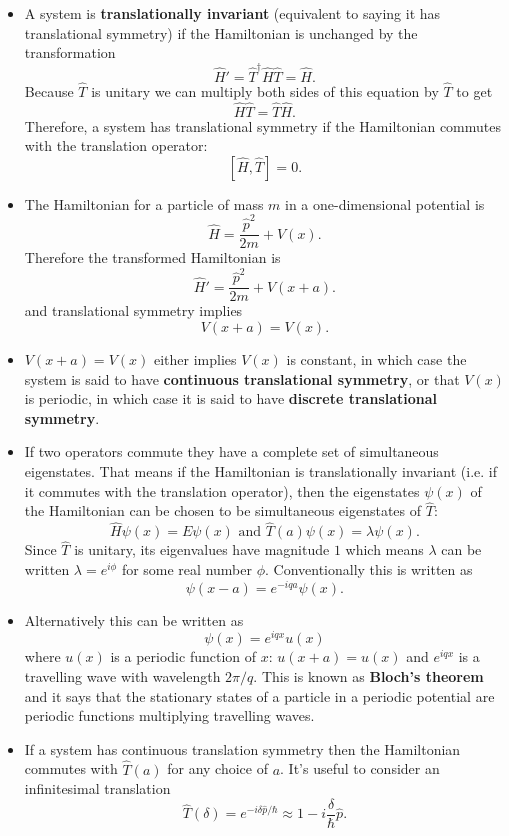 \documentclass{article}
\begin{document}
\begin{itemize}
  \item A system is \textbf{translationally invariant} (equivalent to saying it has translational symmetry) if the Hamiltonian is unchanged by the transformation \[\hat{H}' = \hat{T}^\dagger \hat{H} \hat{T} = \hat{H}.\] Because $\hat{T}$ is unitary we can multiply both sides of this equation by $\hat{T}$ to get \[\hat{H} \hat{T} = \hat{T} \hat{H}.\] Therefore, a system has translational symmetry if the Hamiltonian commutes with the translation operator: \[[\hat{H}, \hat{T}] = 0.\]

  \item The Hamiltonian for a particle of mass $m$ in a one-dimensional potential is \[\hat{H} = \frac{\hat{p}^2}{2 m} + V(x).\] Therefore the transformed Hamiltonian is \[\hat{H}' = \frac{\hat{p}^2}{2 m} + V(x + a).\] and translational symmetry implies \[V(x + a) = V(x).\]

  \item $V(x + a) = V(x)$ either implies $V(x)$ is constant, in which case the system is said to have \textbf{continuous translational symmetry}, or that $V(x)$ is periodic, in which case it is said to have \textbf{discrete translational symmetry}.

  \item If two operators commute they have a complete set of simultaneous eigenstates. That means if the Hamiltonian is translationally invariant (i.e. if it commutes with the translation operator), then the eigenstates $\psi(x)$ of the Hamiltonian can be chosen to be simultaneous eigenstates of $\hat{T}$: \[\hat{H} \psi(x) = E \psi(x) \text{ and } \hat{T}(a) \psi(x) = \lambda \psi(x).\] Since $\hat{T}$ is unitary, its eigenvalues have magnitude $1$ which means $\lambda$ can be written $\lambda = e^{i \phi}$ for some real number $\phi$. Conventionally this is written as \[\psi(x - a) = e^{-i q a} \psi(x).\]

  \item Alternatively this can be written as \[\psi(x) = e^{i q x} u(x)\] where $u(x)$ is a periodic function of $x$: $u(x + a) = u(x)$ and $e^{i q x}$ is a travelling wave with wavelength $2 \pi / q$. This is known as \textbf{Bloch's theorem} and it says that the stationary states of a particle in a periodic potential are periodic functions multiplying travelling waves.

  \item If a system has continuous translation symmetry then the Hamiltonian commutes with $\hat{T}(a)$ for any choice of $a$. It's useful to consider an infinitesimal translation \[\hat{T}(\delta) = e^{-i \delta \hat{p} / \hbar} \approx 1 - i \frac{\delta}{\hbar} \hat{p}.\]


\end{itemize}
\end{document}

